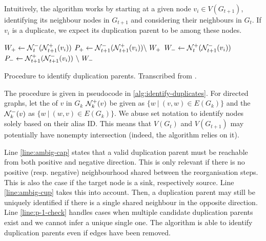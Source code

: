 \documentclass[
	fontsize=10pt, %
	twoside=true, %
	secnumdepth=1, %
  toc=indentunnumbered %
]{kaobook}
\begin{document}
Intuitively, the algorithm works by starting at a given node $v_i \in
V(G_{t+1})$, identifying its neighbour nodes in $G_{t+1}$ and considering their
neighbours in $G_t$. If $v_i$ is a duplicate, we expect its duplication parent
to be among these nodes.

\begin{algorithm}[h]
  \DontPrintSemicolon
     $W_+ \gets \mathcal{N}_t^- ( \mathcal{N}_{t+1}^+(v_i) )$ \; $P_+ \gets
  \mathcal{N}_{t+1}^- ( \mathcal{N}_{t+1}^+(v_i) ) \backslash~ W_+$ \; $W_- \gets
  \mathcal{N}_t^+ ( \mathcal{N}_{t+1}^-(v_i) ) $ \; $P_- \gets \mathcal{N}_{t+1}^+ (
  \mathcal{N}_{t+1}^-(v_i) ) ~\backslash~ W_- $\;
    \label{alg:identify-duplicates}
    \caption{ Procedure to identify duplication parents. Transcribed from
      \citeauthor{nielsen_MachineLearningSupport_2019} \cite{nielsen_MachineLearningSupport_2019}.
    }
\end{algorithm}

The procedure is given in pseudocode in \ref{alg:identify-duplicates}. For
directed graphs, let the  of $v$ in $G_k$
$\mathcal{N}_k^+(v)$ be given as $\{w ~|~ (v,w) \in E(G_{k})\}$ and the  $\mathcal{N}_k^-(v)$ as $\{w ~|~ (w,v) \in E(G_k)\}$. We abuse set
notation to identify nodes solely based on their alias ID. This means that
$V(G_t)$ and $V(G_{t+1})$ may potentially have nonempty intersection (indeed,
the algorithm relies on it).

Line \ref{line:ambig-cap} states that a valid duplication parent must be
reachable from both positive and negative direction. This is only relevant if
there is no positive (resp. negative) neighbourhood shared between the
reorganisation steps. This is also the case if the target node is a sink, 
respectively source. Line \ref{line:ambig-cup} takes this into account. Then, a
duplication parent may still be uniquely identified if there is a single shared
neighbour in the opposite direction.
Line \ref{line:p-1-check} handles cases when multiple candidate duplication
parents exist and we cannot infer a unique single one.
The algorithm is able to identify duplication parents even if edges have been
removed.
\end{document}
